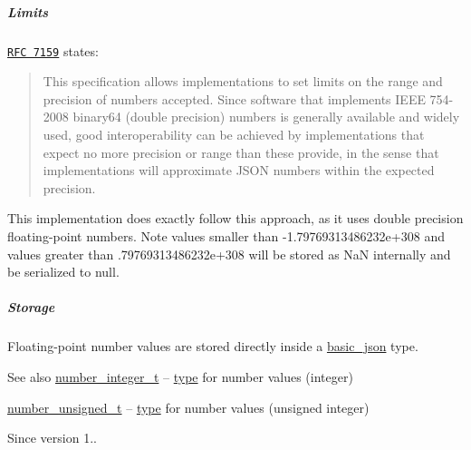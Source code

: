 \subparagraph*{Limits}

\href{http://rfc7159.net/rfc7159}{\tt R\+FC 7159} states\+: \begin{quote}
This specification allows implementations to set limits on the range and precision of numbers accepted. Since software that implements I\+E\+EE 754-\/2008 binary64 (double precision) numbers is generally available and widely used, good interoperability can be achieved by implementations that expect no more precision or range than these provide, in the sense that implementations will approximate J\+S\+ON numbers within the expected precision. \end{quote}


This implementation does exactly follow this approach, as it uses double precision floating-\/point numbers. Note values smaller than {\ttfamily -\/1.\+79769313486232e+308} and values greater than {.\+79769313486232e+308} will be stored as NaN internally and be serialized to {\ttfamily null}.

\subparagraph*{Storage}

Floating-\/point number values are stored directly inside a \hyperlink{classnlohmann_1_1basic__json}{basic\+\_\+json} type.

\begin{DoxySeeAlso}{See also}
\hyperlink{classnlohmann_1_1basic__json_a98e611d67b7bd75307de99c9358ab2dc}{number\+\_\+integer\+\_\+t} -- \hyperlink{classnlohmann_1_1basic__json_a2b2d781d7f2a4ee41bc0016e931cadf7}{type} for number values (integer)

\hyperlink{classnlohmann_1_1basic__json_ab906e29b5d83ac162e823ada2156b989}{number\+\_\+unsigned\+\_\+t} -- \hyperlink{classnlohmann_1_1basic__json_a2b2d781d7f2a4ee41bc0016e931cadf7}{type} for number values (unsigned integer)
\end{DoxySeeAlso}
\begin{DoxySince}{Since}
version 1.. 
\end{DoxySince}
